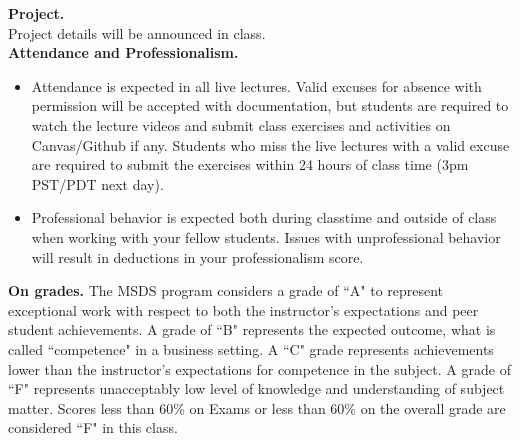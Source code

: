 \documentclass[11pt]{article}
\begin{document}
\noindent \textbf{Project.} \\
Project details will be announced in class. \\

\noindent \textbf{Attendance and Professionalism. }

\begin{itemize}
\item Attendance is expected in all live lectures. Valid excuses for absence with permission will be accepted with documentation, but students are required to watch the lecture videos and submit class exercises and activities on Canvas/Github if any. Students who miss the live lectures with a valid excuse are required to submit the exercises within 24 hours of class time (3pm PST/PDT next day).

\item Professional behavior is expected both during classtime and outside of class when working with your fellow students. Issues with unprofessional behavior will result in deductions in your professionalism score.
\end{itemize}

\newpage

\noindent \textbf{On grades.} The MSDS program considers a grade of ``A" to represent exceptional work with respect to both the instructor's expectations and peer student achievements. A grade of ``B" represents the expected outcome, what is called ``competence" in a business setting. A ``C" grade represents achievements lower than the instructor's expectations for competence in the subject. A grade of ``F" represents unacceptably low level of knowledge and understanding of subject matter.  Scores less than 60\% on Exams or less than 60\% on the overall grade are considered ``F" in this class. \\
\end{document}
